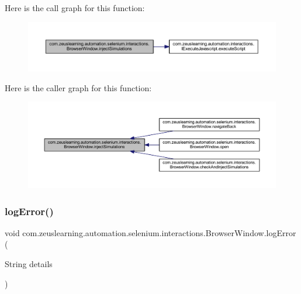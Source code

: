 Here is the call graph for this function\+:
\nopagebreak
\begin{figure}[H]
\begin{center}
\leavevmode
\includegraphics[width=350pt]{d8/d87/classcom_1_1zeuslearning_1_1automation_1_1selenium_1_1interactions_1_1BrowserWindow_afd940a0c96c58bdedd01c1df95933852_cgraph}
\end{center}
\end{figure}
Here is the caller graph for this function\+:
\nopagebreak
\begin{figure}[H]
\begin{center}
\leavevmode
\includegraphics[width=350pt]{d8/d87/classcom_1_1zeuslearning_1_1automation_1_1selenium_1_1interactions_1_1BrowserWindow_afd940a0c96c58bdedd01c1df95933852_icgraph}
\end{center}
\end{figure}
\hypertarget{classcom_1_1zeuslearning_1_1automation_1_1selenium_1_1interactions_1_1BrowserWindow_a27fd367a5ca47cd73865863373b608e8}{}\label{classcom_1_1zeuslearning_1_1automation_1_1selenium_1_1interactions_1_1BrowserWindow_a27fd367a5ca47cd73865863373b608e8} 
\subsubsection{\texorpdfstring{log\+Error()}{logError()}}
{\footnotesize\ttfamily void com.\+zeuslearning.\+automation.\+selenium.\+interactions.\+Browser\+Window.\+log\+Error (\begin{DoxyParamCaption}\item[{String}]{details }\end{DoxyParamCaption})\hspace{0.3cm}{\ttfamily [inline]}}

